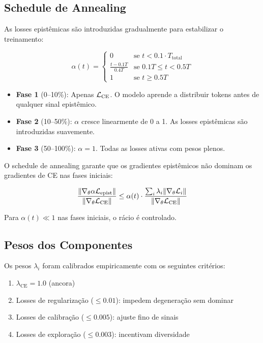 \subsection{Schedule de Annealing}
\label{sec:annealing}

As losses epist\^emicas s\~ao introduzidas gradualmente para estabilizar
o treinamento:

\begin{equation}
    \alpha(t) = \begin{cases}
        0 & \text{se } t < 0.1 \cdot T_{\text{total}} \\
        \frac{t - 0.1T}{0.4T} & \text{se } 0.1T \leq t < 0.5T \\
        1 & \text{se } t \geq 0.5T
    \end{cases}
    \label{eq:annealing}
\end{equation}

\begin{itemize}
    \item \textbf{Fase 1} (0--10\%): Apenas $\mathcal{L}_{\text{CE}}$. O modelo
    aprende a distribuir tokens antes de qualquer sinal epist\^emico.

    \item \textbf{Fase 2} (10--50\%): $\alpha$ cresce linearmente de 0 a 1.
    As losses epist\^emicas s\~ao introduzidas suavemente.

    \item \textbf{Fase 3} (50--100\%): $\alpha = 1$. Todas as losses ativas
    com pesos plenos.
\end{itemize}

\begin{theorem}
O schedule de annealing garante que os gradientes epist\^emicos n\~ao
dominam os gradientes de CE nas fases iniciais:

\begin{equation}
    \frac{\|\nabla_\theta \alpha \mathcal{L}_{\text{epist}}\|}{\|\nabla_\theta \mathcal{L}_{\text{CE}}\|} \leq \alpha(t) \cdot \frac{\sum_i \lambda_i \|\nabla_\theta \mathcal{L}_i\|}{\|\nabla_\theta \mathcal{L}_{\text{CE}}\|}
\end{equation}

Para $\alpha(t) \ll 1$ nas fases iniciais, o r\'acio \'e controlado.
\end{theorem}

\subsection{Pesos dos Componentes}

Os pesos $\lambda_i$ foram calibrados empiricamente com os seguintes
crit\'erios:

\begin{enumerate}
    \item $\lambda_{\text{CE}} = 1.0$ (ancora)
    \item Losses de regulariza\c{c}\~ao ($\leq 0.01$): impedem degenera\c{c}\~ao
    sem dominar
    \item Losses de calibra\c{c}\~ao ($\leq 0.005$): ajuste fino de sinais
    \item Losses de explora\c{c}\~ao ($\leq 0.003$): incentivam diversidade
\end{enumerate}
